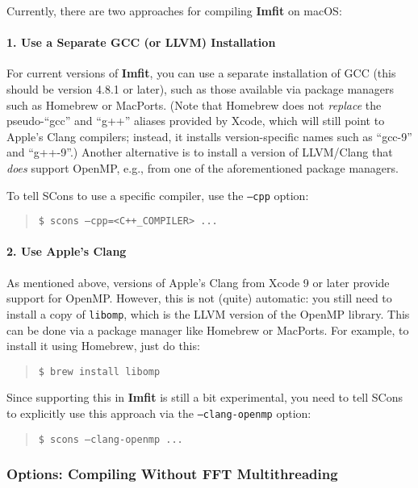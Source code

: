\documentclass[10pt,a4paper,article]{memoir}
\newcommand{\imfit}{\textbf{Imfit}}
\begin{document}
\bigskip

Currently, there are two approaches for compiling \imfit{} on macOS:


\paragraph{1. Use a Separate GCC (or LLVM) Installation}

For current versions of \imfit{}, you can use a separate installation of
GCC (this should be version 4.8.1 or later), such as those available via
package managers such as Homebrew or MacPorts. (Note that Homebrew does
not \textit{replace} the pseudo-``gcc'' and ``g++'' aliases provided by
Xcode, which will still point to Apple's Clang compilers; instead, it
installs version-specific names such as ``gcc-9'' and ``g++-9''.)
Another alternative is to install a version of LLVM/Clang that
\textit{does} support OpenMP, e.g., from one of the aforementioned
package managers.

To tell SCons to use a specific compiler, use the
\texttt{--cpp} option:
\begin{quote}
\texttt{\$ scons --cpp=<C++\_COMPILER> ...}
\end{quote}



\paragraph{2. Use Apple's Clang}

As mentioned above, versions of Apple's Clang from Xcode 9 or later provide
support for OpenMP. However, this is not (quite) automatic: you still
need to install a copy of \texttt{libomp}, which is the LLVM version of
the OpenMP library. This can be done via a package manager like Homebrew
or MacPorts. For example, to install it using Homebrew, just do this:
\begin{quote}
\texttt{\$ brew install libomp}
\end{quote}

Since supporting this in \imfit{} is still a bit experimental, you need
to tell SCons to explicitly use this approach via the \texttt{--clang-openmp}
option:
\begin{quote}
\texttt{\$ scons --clang-openmp ...}
\end{quote}


\subsubsection{Options: Compiling Without FFT Multithreading}
\end{document}

